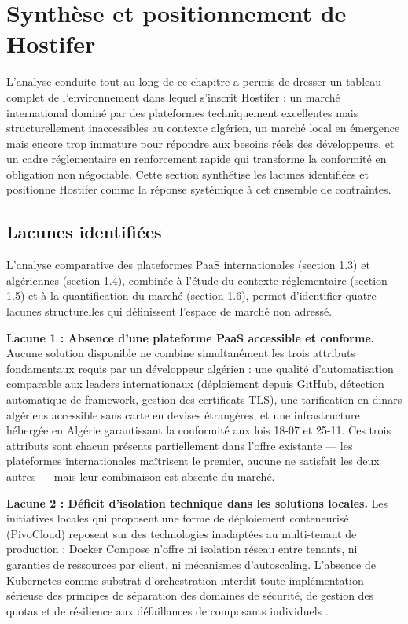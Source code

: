 
\section{Synthèse et positionnement de Hostifer}

L'analyse conduite tout au long de ce chapitre a permis de dresser un tableau complet de l'environnement dans lequel s'inscrit Hostifer : un marché international dominé par des plateformes techniquement excellentes mais structurellement inaccessibles au contexte algérien, un marché local en émergence mais encore trop immature pour répondre aux besoins réels des développeurs, et un cadre réglementaire en renforcement rapide qui transforme la conformité en obligation non négociable. Cette section synthétise les lacunes identifiées et positionne Hostifer comme la réponse systémique à cet ensemble de contraintes.

\subsection*{Lacunes identifiées}

L'analyse comparative des plateformes PaaS internationales (section 1.3) et algériennes (section 1.4), combinée à l'étude du contexte réglementaire (section 1.5) et à la quantification du marché (section 1.6), permet d'identifier quatre lacunes structurelles qui définissent l'espace de marché non adressé.

\textbf{Lacune 1 : Absence d'une plateforme PaaS accessible et conforme.} Aucune solution disponible ne combine simultanément les trois attributs fondamentaux requis par un développeur algérien : une qualité d'automatisation comparable aux leaders internationaux (déploiement depuis GitHub, détection automatique de framework, gestion des certificats TLS), une tarification en dinars algériens accessible sans carte en devises étrangères, et une infrastructure hébergée en Algérie garantissant la conformité aux lois 18-07 et 25-11. Ces trois attributs sont chacun présents partiellement dans l'offre existante — les plateformes internationales maîtrisent le premier, aucune ne satisfait les deux autres — mais leur combinaison est absente du marché.

\textbf{Lacune 2 : Déficit d'isolation technique dans les solutions locales.} Les initiatives locales qui proposent une forme de déploiement conteneurisé (PivoCloud) reposent sur des technologies inadaptées au multi-tenant de production : Docker Compose n'offre ni isolation réseau entre tenants, ni garanties de ressources par client, ni mécanismes d'autoscaling. L'absence de Kubernetes comme substrat d'orchestration interdit toute implémentation sérieuse des principes de séparation des domaines de sécurité, de gestion des quotas et de résilience aux défaillances de composants individuels \cite{k8s-concepts}.

